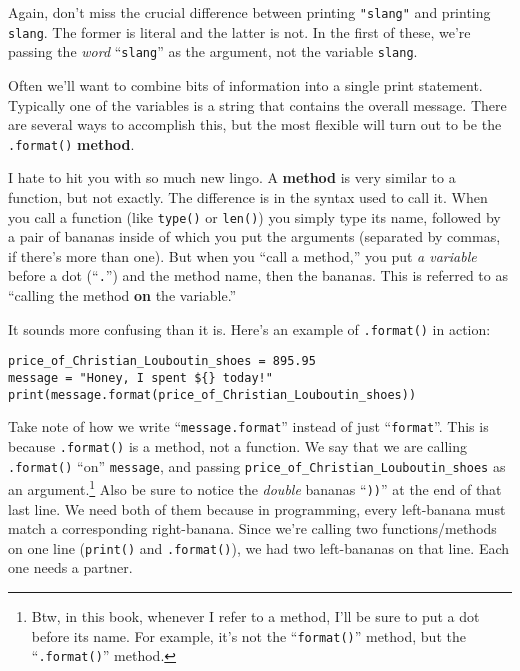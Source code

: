 Again, don't miss the crucial difference between printing \texttt{"slang"} and
printing \texttt{slang}. The former is literal and the latter is not. In the
first of these, we're passing the \textit{word} ``\texttt{slang}'' as the
argument, not the variable \texttt{slang}.

Often we'll want to combine bits of information into a single print statement.
Typically one of the variables is a string that contains the overall message.
There are several ways to accomplish this, but the most flexible will turn out
to be the \texttt{.format()} \textbf{method}.

I hate to hit you with so much new lingo. A \textbf{method} is very similar to
a function, but not exactly. The difference is in the syntax used to call it.
When you call a function (like \texttt{type()} or \texttt{len()}) you simply
type its name, followed by a pair of bananas inside of which you put the
arguments (separated by commas, if there's more than one). But when you ``call
a method,'' you put \textit{a variable} before a dot (``\texttt{.}'') and the
method name, then the bananas. This is referred to as ``calling the method
\textbf{on} the variable.''

It sounds more confusing than it is. Here's an example of \texttt{.format()} in
action:

\begin{Verbatim}[fontsize=\small,samepage=true,frame=single,framesep=3mm]
price_of_Christian_Louboutin_shoes = 895.95
message = "Honey, I spent ${} today!"
print(message.format(price_of_Christian_Louboutin_shoes))
\end{Verbatim}

Take note of how we write ``\texttt{message.format}'' instead of just
``\texttt{format}''. This is because \texttt{.format()} is a method, not a
function. We say that we are calling \texttt{.format()} ``on''
\texttt{message}, and passing \texttt{price\_of\_Christian\_Louboutin\_shoes}
as an argument.\footnote{Btw, in this book, whenever I refer to a method, I'll
be sure to put a dot before its name. For example, it's not the
``\texttt{format()}'' method, but the ``\texttt{.format()}'' method.} Also be
sure to notice the \textit{double} bananas ``\texttt{))}'' at the end of that
last line. We need both of them because in programming, every left-banana must
match a corresponding right-banana. Since we're calling two functions/methods
on one line (\texttt{print()} and \texttt{.format()}), we had two left-bananas
on that line. Each one needs a partner.

